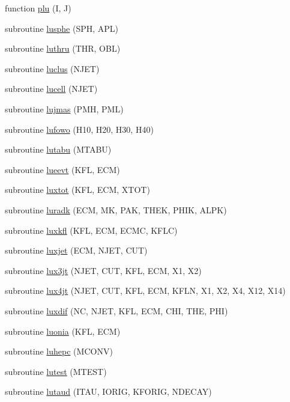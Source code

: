 \begin{DoxyCompactItemize}
\item 
function \hyperlink{jetset7409_8f_ab4b095f080a22e776f5a9cc25e23cc54}{plu} (I, J)
\item 
subroutine \hyperlink{jetset7409_8f_ae14ba0d975a6c3414f4ba28a2120d0e1}{lusphe} (S\+PH, A\+PL)
\item 
subroutine \hyperlink{jetset7409_8f_a01c2cccfd28fcbfad23fdf0d6d955352}{luthru} (T\+HR, O\+BL)
\item 
subroutine \hyperlink{jetset7409_8f_a5a451276fe957734030c886bc4f8e814}{luclus} (N\+J\+ET)
\item 
subroutine \hyperlink{jetset7409_8f_add8cff69adb0e015427c0f1f8b8f7cd6}{lucell} (N\+J\+ET)
\item 
subroutine \hyperlink{jetset7409_8f_a9929cdd809f7d306aab1384aa26896dd}{lujmas} (P\+MH, P\+ML)
\item 
subroutine \hyperlink{jetset7409_8f_a70bb3b57ab3c403561d2f5f7ed38006c}{lufowo} (H10, H20, H30, H40)
\item 
subroutine \hyperlink{jetset7409_8f_a8395a42e4cd2d6d44338b55b4b2a08b1}{lutabu} (M\+T\+A\+BU)
\item 
subroutine \hyperlink{jetset7409_8f_add2076f5ebfddada6c0dddaeb75a4d55}{lueevt} (K\+FL, E\+CM)
\item 
subroutine \hyperlink{jetset7409_8f_aed6d4231433f40bf5445fe3dc7b94703}{luxtot} (K\+FL, E\+CM, X\+T\+OT)
\item 
subroutine \hyperlink{jetset7409_8f_a685edd0a41124ba2569f60a4f4585cc2}{luradk} (E\+CM, MK, P\+AK, T\+H\+EK, P\+H\+IK, A\+L\+PK)
\item 
subroutine \hyperlink{jetset7409_8f_a5c1cdd9185569769b334e670af014ec9}{luxkfl} (K\+FL, E\+CM, E\+C\+MC, K\+F\+LC)
\item 
subroutine \hyperlink{jetset7409_8f_a2fa56de45847b9554a86d38ee8f22cdb}{luxjet} (E\+CM, N\+J\+ET, C\+UT)
\item 
subroutine \hyperlink{jetset7409_8f_ac4e81e489406df9e1371c725c7e33257}{lux3jt} (N\+J\+ET, C\+UT, K\+FL, E\+CM, X1, X2)
\item 
subroutine \hyperlink{jetset7409_8f_a4ec86c629d8ef040973034155385dd09}{lux4jt} (N\+J\+ET, C\+UT, K\+FL, E\+CM, K\+F\+LN, X1, X2, X4, X12, X14)
\item 
subroutine \hyperlink{jetset7409_8f_a38fb2f57dc9ce2f56a98e6484f99c12a}{luxdif} (NC, N\+J\+ET, K\+FL, E\+CM, C\+HI, T\+HE, P\+HI)
\item 
subroutine \hyperlink{jetset7409_8f_a88f68ff12848dace3953139dc10ca751}{luonia} (K\+FL, E\+CM)
\item 
subroutine \hyperlink{jetset7409_8f_a362872565aac7b016cf9c4297e794af9}{luhepc} (M\+C\+O\+NV)
\item 
subroutine \hyperlink{jetset7409_8f_af1bc51f2ef657321e77c99f61c52bc07}{lutest} (M\+T\+E\+ST)
\item 
subroutine \hyperlink{jetset7409_8f_af2403749427df6b9d871c74fafc5838c}{lutaud} (I\+T\+AU, I\+O\+R\+IG, K\+F\+O\+R\+IG, N\+D\+E\+C\+AY)
\end{DoxyCompactItemize}


